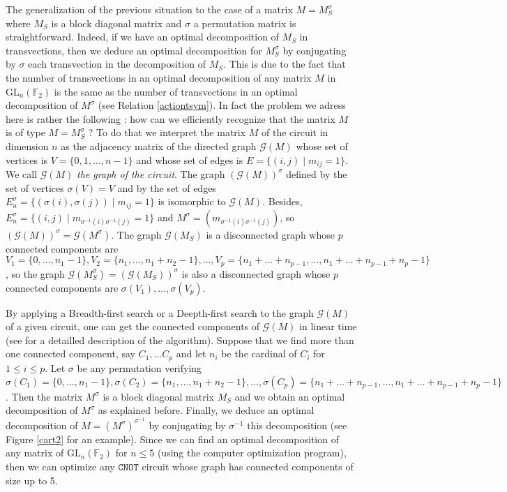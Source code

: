 \documentclass[a4paper,12pt,fleqn]{article}
\newcommand\cnot{\mathtt{CNOT}}
\newcommand\GL[1][n]{\mathrm{GL}_{#1}(\mathbb{F}_2)}
\renewcommand\leq{\leqslant}
\begin{document}
  \medskip
  
  The generalization of the previous situation to the case of  a matrix $M=M_S^{\sigma}$ where $M_S$ is a block diagonal matrix and $\sigma$ a permutation matrix is straightforward. Indeed, if we have an optimal decomposition of $M_S$ in transvections, then we deduce an optimal decomposition for $M_S^{\sigma}$ by conjugating by $\sigma$ each transvection in the decomposition of $M_S$. This is due to the fact that the number of transvections in an optimal decomposition of any matrix $M$ in $\GL$ is the same as the number of transvections in an optimal decomposition of $M^{\sigma}$ (see Relation \eqref{actiontsym}). In fact the problem we adress here is rather the following : how can we efficiently recognize that the matrix $M$ is of type $M=M_S^{\sigma}$ ? To do that we interpret the matrix $M$ of the circuit in dimension $n$ as the adjacency matrix of the directed  graph $\mathcal{G}(M)$ whose set of vertices is $V=\{0,1,\dots,n-1\}$ and whose set of edges is $E=\{(i,j)\mid m_{ij}=1\}$. We call $\mathcal{G}(M)$ \emph{the graph of the circuit}. The graph $(\mathcal{G}(M))^{\sigma}$ defined by the set of vertices $\sigma(V)=V$ and by the set of edges $E_n^{\sigma}=\{(\sigma(i),\sigma(j))\mid m_{ij}=1\}$
  is isomorphic to $\mathcal{G}(M)$. Besides, $E_n^{\sigma}=\{(i,j)\mid m_{\sigma^{-1}(i)\sigma^{-1}(j)}=1\}$ and $M^{\sigma}=\left(m_{\sigma^{-1}(i)\sigma^{-1}(j)}\right)$,
  so $(\mathcal{G}(M))^{\sigma}=\mathcal{G}(M^{\sigma})$.
    The graph $\mathcal{G}(M_S)$ is a disconnected graph whose $p$ connected components are
    $V_1=\{0,\dots,n_1-1\},V_2=\{n_1,\dots,n_1+n_2-1\},\dots,V_p=\{n_1+\dots + n_{p-1},\dots,n_1+\dots +n_{p-1}+n_p-1\}$
    , so the graph $\mathcal{G}(M_S^{\sigma})=(\mathcal{G}(M_S))^{\sigma}$ is also
    a disconnected graph whose $p$ connected components are $\sigma(V_1),\dots,\sigma(V_p)$.

    By applying a Breadth-first search or a Deepth-first search to the graph $\mathcal{G}(M)$ of a given circuit, one can get the connected components of $\mathcal{G}(M)$ in linear time (see \cite{HT1973} for a detailled description of the algorithm). Suppose that we find more than one connected component, say $C_1,\dots C_p$ and let $n_i$ be the cardinal of $C_i$ for $1\leq i\leq p$. Let $\sigma$ be any permutation verifying $\sigma(C_1)=\{0,\dots,n_1-1\}, \sigma(C_2)=\{n_1,\dots,n_1+n_2-1\},\dots, \sigma(C_p)=\{n_1+\dots + n_{p-1},\dots,n_1+\dots +n_{p-1}+n_p-1\}$. Then the matrix $M^{\sigma}$ is a block diagonal matrix $M_S$ and we obtain an optimal decomposition of $M^{\sigma}$ as explained before. Finally, we deduce  an optimal decomposition of $M=(M^{\sigma})^{\sigma^{-1}}$ by conjugating by $\sigma^{-1}$ this decomposition (see Figure \ref{cart2} for an example). Since we can find an optimal decomposition of any matrix of $\GL$ for $n\leq5$ (using the computer optimization program), then we can optimize any $\cnot$ circuit whose graph has connected components of size up to 5.
\end{document}
